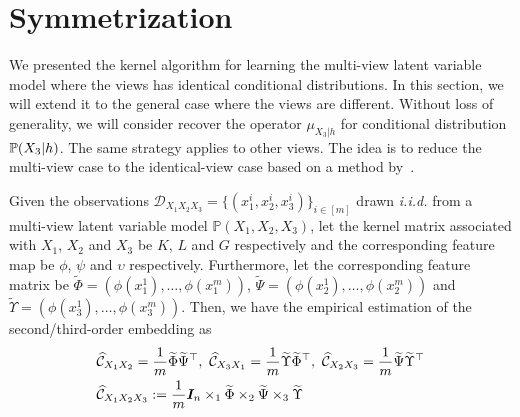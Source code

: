 \documentclass{article}
\begin{document}
\vspace{-3mm}
\section{Symmetrization}
\label{sec:symmetrization}
\vspace{-2mm}

We presented the kernel algorithm for learning the multi-view latent variable model where the views has identical conditional distributions. In this section, we will extend it to the general case where the views are different. Without loss of generality, we will consider recover the operator $\mu_{X_3|h}$ for conditional distribution $\mathbb{P}(X_3|h)$. The same strategy applies to other views. The idea is to reduce the multi-view case to the identical-view case based on a method by~\cite{AnandkumarEtal:twosvd12}.

Given the observations $\mathcal{D}_{X_1X_2X_3}=\{(x_1^i, x_2^i, x_3^i)\}_{i\in[m]}$ drawn \emph{i.i.d.} from a multi-view latent variable model $\mathbb{P}(X_1, X_2, X_3)$, let the kernel matrix associated with $X_1$, $X_2$ and $X_3$ be $K$, $L$ and $G$ respectively and the corresponding feature map be $\phi$, $\psi$ and $\upsilon$ respectively. Furthermore, let the corresponding feature matrix be $\widetilde \Phi=(\phi(x_1^1),\ldots,\phi(x_1^m))$, $\widetilde\Psi=(\phi(x_2^1),\ldots,\phi(x_2^m))$ and $\widetilde \Upsilon=(\phi(x_3^1),\ldots,\phi(x_3^m))$. Then, we have the empirical estimation of the second/third-order embedding as
%
\begin{align*}
&\widehat{\mathcal{C}}_{X_1 X_2} = \frac{1}{m}\widetilde \Phi \widetilde \Psi^\top,~\widehat{\mathcal{C}}_{X_3 X_1} = \frac{1}{m}\widetilde \Upsilon \widetilde \Phi^\top,~\widehat{\mathcal{C}}_{X_2 X_3} = \frac{1}{m} \widetilde \Psi \widetilde \Upsilon^\top\\
&\widehat{\mathcal{C}}_{X_1 X_2 X_3}:=
\frac{1}{m}\bm{I}_n \times_1 \widetilde \Phi \times_2 \widetilde \Psi \times_3 \widetilde \Upsilon
\end{align*}
%
\end{document}
